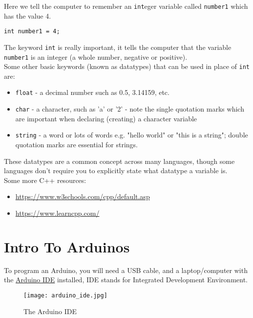 \documentclass[../TinyBot.tex]{subfiles}
\begin{document}
Here we tell the computer to remember an \lstinline[]!int!eger variable called \lstinline[]!number1! which has the value 4.
\begin{lstlisting}
int number1 = 4;
\end{lstlisting}

The keyword \lstinline[]!int! is really important, it tells the computer that the variable \lstinline[]!number1! is an integer (a whole number, negative or positive). \\

Some other basic keywords (known as datatypes) that can be used in place of \lstinline[]!int! are:
\begin{itemize}[label={$\triangleright$}]
  \item \lstinline[]!float! - a decimal number such as 0.5, 3.14159, etc. 
  \item \lstinline[]!char! - a character, such as 'a' or '2' - note the single quotation marks which are important when declaring (creating) a character variable
  \item \lstinline[]!string! - a word or lots of words e.g. "hello world" or "this is a string"; double quotation marks are essential for strings. 
\end{itemize}

These datatypes are a common concept across many languages, though some languages don't require you to explicitly state what datatype a variable is. \\

Some more C++ resources:
\begin{itemize}[label={$\triangleright$}]
  \item \href{https://www.w3schools.com/cpp/default.asp}{https://www.w3schools.com/cpp/default.asp}
  \item \href{https://www.learncpp.com/}{https://www.learncpp.com/}
\end{itemize}

\section{Intro To Arduinos} \label{sec:introarduino}

To program an Arduino, you will need a USB cable, and a laptop/computer with the \href{https://www.arduino.cc/en/software}{Arduino IDE} installed, IDE stands for Integrated Development Environment. 



\begin{figure}[h]
    \centering
    \texttt{[image: arduino\_ide.jpg]}
    \caption{The Arduino IDE}
\end{figure}
\end{document}
